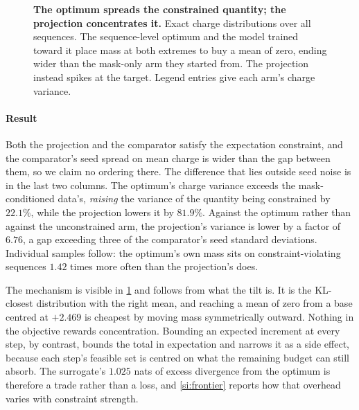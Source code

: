 \begin{figure}[t]
  \centering
  \caption{\textbf{The optimum spreads the constrained quantity; the projection
    concentrates it.} Exact charge distributions over all sequences. The
    sequence-level optimum and the model trained toward it place mass at both extremes
    to buy a mean of zero, ending wider than the mask-only arm they started from. The
    projection instead spikes at the target. Legend entries give each arm's charge
    variance.}
  \label{fig:charge}
\end{figure}

\paragraph{Result}
Both the projection and the comparator satisfy the expectation constraint, and the comparator's seed spread on mean charge
is wider than the gap between them, so we claim no ordering there. The difference that
lies outside seed noise is in the last two columns. The
optimum's charge variance exceeds the mask-conditioned data's, \emph{raising} the variance of
the quantity being constrained by $22.1\%$, while the projection lowers it by $81.9\%$. Against the optimum rather than against the unconstrained arm, the
projection's variance is lower by a factor of $6.76$, a gap exceeding three of the comparator's seed
standard deviations. Individual samples follow: the optimum's own mass sits on
constraint-violating sequences $1.42$ times more often than the projection's does.

The mechanism is visible in \cref{fig:charge} and follows from what the tilt is. It is
the KL-closest distribution with the right mean, and reaching a mean of zero from a base
centred at $+2.469$ is cheapest by moving mass symmetrically outward. Nothing in the
objective rewards concentration. Bounding an expected increment at every step, by
contrast, bounds the total in expectation and narrows it as a side effect, because each
step's feasible set is centred on what the remaining budget can still absorb.
The surrogate's $1.025$ nats of excess divergence from the optimum is therefore a trade
rather than a loss, and \cref{si:frontier} reports how that overhead varies with
constraint strength.

